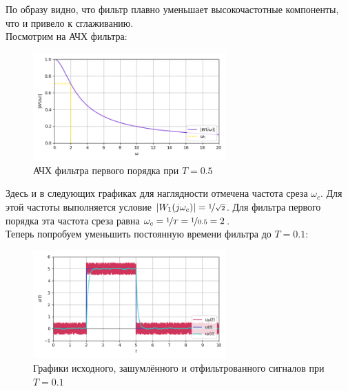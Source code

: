 \documentclass[a4paper]{article}
\begin{document}
По образу видно, что фильтр плавно уменьшает высокочастотные компоненты, что и привело к сглаживанию.\\[0.5em]
Посмотрим на АЧХ фильтра:
\begin{figure}[H]
    \centering \includegraphics[width=0.66\textwidth]{sources/second/part1/a=5 T=0.5/3_filter.png}
    \caption{АЧХ фильтра первого порядка при $T = 0.5$}
\end{figure}
Здесь и в следующих графиках для наглядности отмечена частота среза $\omega_c$. Для этой частоты выполняется условие $|W_1(j\omega_c)| = \nicefrac{1}{\sqrt{2}}$. Для фильтра первого порядка эта частота среза равна $\omega_c = \nicefrac{1}{T} = \nicefrac{1}{0.5} = 2$.\\[0.5em]
Теперь попробуем уменьшить постоянную времени фильтра до $T = 0.1$:
\begin{figure}[H]
    \centering \includegraphics[width=0.66\textwidth]{sources/second/part1/a=5 T=0.1/1_signal_cmp.png}
    \caption{Графики исходного, зашумлённого и отфильтрованного сигналов при $T = 0.1$}
\end{figure}\vspace{-1em}
\end{document}
